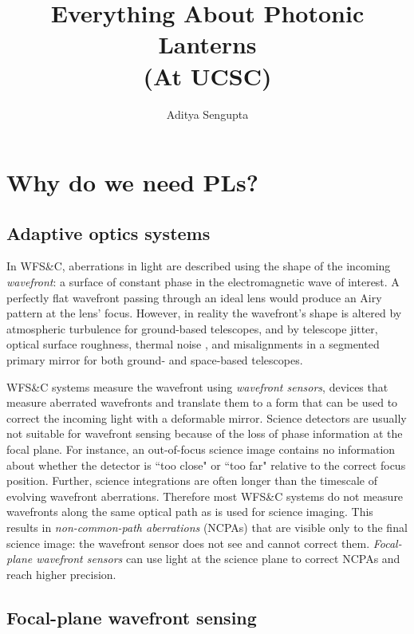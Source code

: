 \documentclass[12pt]{article}
\title{Everything About Photonic Lanterns \\ (At UCSC)}
\author{Aditya Sengupta}
\begin{document}
\maketitle
\tableofcontents

\section{Why do we need PLs?}

\subsection{Adaptive optics systems}


In WFS\&C, aberrations in light are described using the shape of the incoming \textit{wavefront}: a surface of constant phase in the electromagnetic wave of interest. A perfectly flat wavefront passing through an ideal lens would produce an Airy pattern at the lens' focus. However, in reality the wavefront's shape is altered by atmospheric turbulence for ground-based telescopes, and by telescope jitter, optical surface roughness, thermal noise \parencite{Sun20}, and misalignments in a segmented primary mirror for both ground- and space-based telescopes.

WFS\&C systems measure the wavefront using \textit{wavefront sensors}, devices that measure aberrated wavefronts and translate them to a form that can be used to correct the incoming light with a deformable mirror. Science detectors are usually not suitable for wavefront sensing because of the loss of phase information at the focal plane. For instance, an out-of-focus science image contains no information about whether the detector is ``too close" or ``too far" relative to the correct focus position. Further, science integrations are often longer than the timescale of evolving wavefront aberrations. Therefore most WFS\&C systems do not measure wavefronts along the same optical path as is used for science imaging. This results in \textit{non-common-path aberrations} (NCPAs) that are visible only to the final science image: the wavefront sensor does not see and cannot correct them. \textit{Focal-plane wavefront sensors} can use light at the science plane to correct NCPAs and reach higher precision.

\subsection{Focal-plane wavefront sensing}
\end{document}
